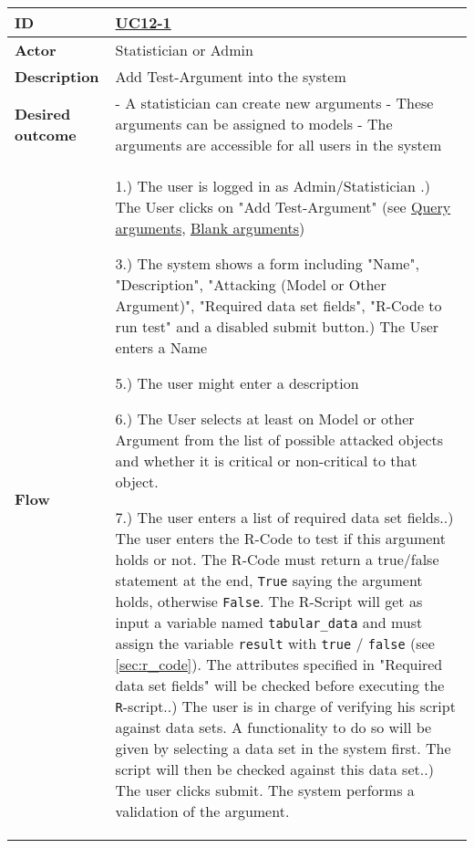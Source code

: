 \begin{table}[h]
	\tiny{
		\begin{tabular}{|p{1.5cm} p{11.5cm}|}
			\hline
				\textbf{ID} & 
					\href{https://trello.com/c/2V6Cl65u}{UC12-1}\\
				
				\hline
				\textbf{Actor} & Statistician or Admin \\
				\hline
				\textbf{Description} & 
					Add Test-Argument into the system\\
				\hline
				\textbf{Desired outcome} & 
					- A statistician can create new arguments \newline
					- These arguments can be assigned to models \newline
					- The arguments are accessible for all users in the system \newline
			\\
			\hline
				\textbf{Flow} & 
					1.) The user is logged in as Admin/Statistician  \newline
					2.) The User clicks on "Add Test-Argument" (see \href{https://trello.com/c/OwM2Z7wt}{Query arguments}, \href{https://trello.com/c/Rg6GPnNE/39-uc12-5-add-attacks-between-arguments}{Blank arguments})\newline
	
				3.) The system shows a form including "Name", "Description", "Attacking (Model or Other Argument)", "Required data set fields", "R-Code to run test" and a disabled submit button\newline
					4.) The User enters a Name\newline
	
				5.) The user might enter a description\newline
	
				6.) The User selects at least on Model or other Argument from the list of possible attacked objects and whether it is critical or non-critical to that object.\newline
	
				7.) The user enters a list of required data set fields.\newline
					8.) The user enters the R-Code to test if this argument holds or not. The R-Code must return a true/false statement at the end, \texttt{True} saying the argument holds, otherwise \texttt{False}. The R-Script will get as input a variable named \texttt{tabular\_data}  and must assign the variable \texttt{result} with \texttt{true} / \texttt{false} (see \autoref{sec:r_code}). The attributes specified in "Required data set fields" will be checked before executing the \texttt{R}-script.\newline
					9.) The user is in charge of verifying his script against data sets. A functionality to do so will be given by selecting a data set in the system first. The script will then be checked against this data set.\newline
					10.) The user clicks submit. The system performs a validation of the argument.\newline
	

\end{tabular}}
\end{table}

